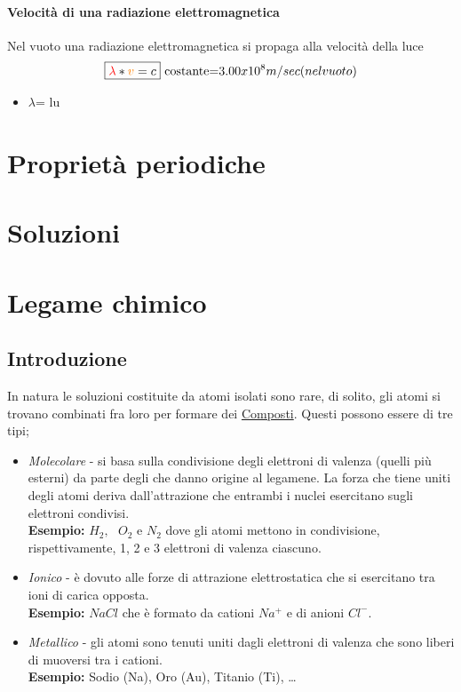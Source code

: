 \documentclass{book}
\begin{document}
\subsubsection{Velocità di una radiazione elettromagnetica}
Nel vuoto una radiazione elettromagnetica si propaga alla velocità della luce
\begin{equation}
	\boxed{{\color{red}\lambda}*{\color{orange}v}=c} \text{ costante=}3.00x10^8m/sec (nel vuoto)
\end{equation}
\begin{itemize}
\item {\color{red}$\lambda$= lu}
\end{itemize}

\chapter{Proprietà periodiche}

\chapter{Soluzioni}

\chapter{Legame chimico}
\section{Introduzione}
In natura le soluzioni costituite da atomi isolati sono rare, di solito, gli
atomi si trovano combinati fra loro per formare dei \underline{Composti}.
Questi possono essere di tre tipi; 
\begin{itemize}
	\item \textit{Molecolare} - si basa sulla condivisione degli elettroni di
		valenza (quelli più esterni) da parte degli che danno origine al
		legamene. La forza che tiene uniti degli atomi deriva dall'attrazione
		che entrambi i nuclei esercitano sugli elettroni condivisi.\\
		\textbf{Esempio:} $H_2,\text{ }O_2 \text{ e } N_2$ dove gli atomi
		mettono in condivisione, rispettivamente, 1, 2 e 3 elettroni di valenza
		ciascuno.
	\item \textit{Ionico} - è dovuto alle forze di attrazione elettrostatica
		che si esercitano tra ioni di carica opposta.\\
		\textbf{Esempio:} $NaCl$ che è formato da cationi $Na^+$ e di anioni
		$Cl^-$.
	\item \textit{Metallico} - gli atomi sono tenuti uniti dagli elettroni di
		valenza che sono liberi di muoversi tra i cationi.\\
		\textbf{Esempio:} Sodio (Na), Oro (Au), Titanio (Ti), \dots
\end{itemize}
\end{document}
